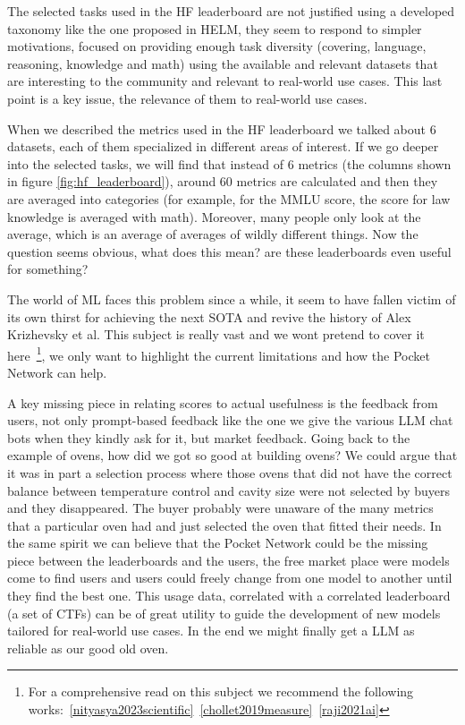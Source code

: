 The selected tasks used in the \gls{HF} leaderboard are not justified using a developed taxonomy like the one proposed in \gls{HELM}, they seem to respond to simpler motivations, focused on providing enough task diversity (covering, language, reasoning, knowledge and math) using the available and relevant datasets that are interesting to the community and relevant to real-world use cases. This last point is a key issue, the relevance of them to real-world use cases.

When we described the metrics used in the \gls{HF} leaderboard we talked about 6 datasets, each of them specialized in different areas of interest. If we go deeper into the selected tasks, we will find that instead of 6 metrics (the columns shown in figure \ref{fig:hf_leaderboard}), around 60 metrics are calculated and then they are averaged into categories (for example, for the MMLU score, the score for law knowledge is averaged with math). Moreover, many people only look at the average, which is an average of averages of wildly different things. 
Now the question seems obvious, what does this mean? are these leaderboards even useful for something?

The world of \gls{ML} faces this problem since a while, it seem to have fallen victim of its own thirst for achieving the next \gls{SOTA} and revive the history of Alex Krizhevsky et al. This subject is really vast and we wont pretend to cover it here~\footnote{For a comprehensive read on this subject we recommend the following works:~\ref{nityasya2023scientific}~\ref{chollet2019measure}~\ref{raji2021ai}}, we only want to highlight the current limitations and how the Pocket Network can help.

A key missing piece in relating scores to actual usefulness is the feedback from users, not only prompt-based feedback like the one we give the various \gls{LLM} chat bots when they kindly ask for it, but market feedback. Going back to the example of ovens, how did we got so good at building ovens? We could argue that it was in part a selection process where those ovens that did not have the correct balance between temperature control and cavity size were not selected by buyers and they disappeared. The buyer probably were unaware of the many metrics that a particular oven had and just selected the oven that fitted their needs. In the same spirit we can believe that the Pocket Network could be the missing piece between the leaderboards and the users, the free market place were models come to find users and users could freely change from one model to another until they find the best one. This usage data, correlated with a correlated leaderboard (a set of \gls{CTF}s) can be of great utility to guide the development of new models tailored for real-world use cases. In the end we might finally get a \gls{LLM} as reliable as our good old oven.